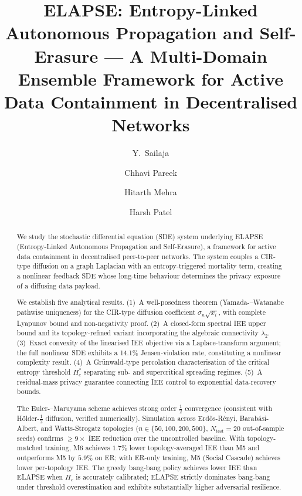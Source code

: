 \documentclass[review,12pt]{elsarticle}
\newcommand{\Hc}{H_c}
\begin{document}
\begin{frontmatter}

\title{ELAPSE: Entropy-Linked Autonomous Propagation and Self-Erasure ---
       A Multi-Domain Ensemble Framework for Active Data Containment
       in Decentralised Networks}

\author[rv]{Y.~Sailaja}

\author[rv]{Chhavi Pareek}
\author[rv]{Hitarth Mehra}
\author[rv]{Harsh Patel}

\address[rv]{Department of Mathematics / Department of Computer Science \&
             Engineering, RV College of Engineering, Bangalore 560059, India}

\begin{abstract}
We study the stochastic differential equation (SDE) system underlying ELAPSE
(Entropy-Linked Autonomous Propagation and Self-Erasure), a framework for
active data containment in decentralised peer-to-peer networks.  The system
couples a CIR-type diffusion on a graph Laplacian with an entropy-triggered
mortality term, creating a nonlinear feedback SDE whose long-time behaviour
determines the privacy exposure of a diffusing data payload.

We establish five analytical results.
(1)~A well-posedness theorem (Yamada-–Watanabe pathwise uniqueness) for the
CIR-type diffusion coefficient $\sigma_n\sqrt{x_i}$, with complete Lyapunov
bound and non-negativity proof.
(2)~A closed-form spectral IEE upper bound and its topology-refined variant
incorporating the algebraic connectivity $\lambda_2$.
(3)~Exact convexity of the linearised IEE objective via a Laplace-transform
argument; the full nonlinear SDE exhibits a 14.1\% Jensen-violation rate,
constituting a nonlinear complexity result.
(4)~A Grünwald-type percolation characterisation of the critical entropy
threshold $\Hc^*$ separating sub- and supercritical spreading regimes.
(5)~A residual-mass privacy guarantee connecting IEE control to exponential
data-recovery bounds.

The Euler-–Maruyama scheme achieves strong order $\tfrac{1}{2}$ convergence
(consistent with Hölder-$\tfrac{1}{2}$ diffusion, verified numerically).
Simulation across Erd\H{o}s-R\'enyi, Barab\'asi-Albert, and Watts-Strogatz
topologies ($n \in \{50, 100, 200, 500\}$, $N_{\mathrm{test}}=20$
out-of-sample seeds) confirms $\geq 9\times$ IEE reduction over the
uncontrolled baseline.
With topology-matched training, M6 achieves $1.7\%$ lower topology-averaged IEE
than M5 and outperforms M5 by $5.9\%$ on ER; with ER-only training, M5
(Social Cascade) achieves lower per-topology IEE.  The greedy bang-bang policy
achieves lower IEE than ELAPSE when $\Hc$ is accurately calibrated; ELAPSE
strictly dominates bang-bang under threshold overestimation and exhibits
substantially higher adversarial resilience.
\end{abstract}


\end{frontmatter}
\end{document}
